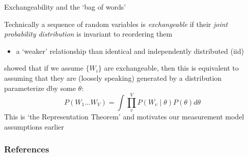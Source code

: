 \documentclass{hertieteaching}\usepackage[]{graphicx}\usepackage[]{color}
\begin{document}
\begin{frame}{Exchangeability and the `bag of words'}
	
Technically a sequence of random variables is \textit{exchangeable} if 
their \textit{joint probability distribution} is invariant to reordering them
\begin{itemize}
  \item a `weaker' relationship than identical and independently distributed (iid)
\end{itemize}

\textcite{deFinetti2008} showed that if we assume $\{W_i\}$ are exchangeable, then this is equivalent to assuming that they are (loosely speaking) generated by a distribution parameterize dby some $\theta$:
$$
P(W_1 \ldots W_V) = \int \prod^V_v P(W_v \mid \theta) P(\theta) d\theta 
$$
This is `the Representation Theorem' and motivates our measurement model assumptions earlier

\begin{center}
\end{center}
\end{frame}


\begin{frame}{}
\end{frame}




\begin{frame}[allowframebreaks]
\frametitle{References}

\printbibliography

\end{frame}
\end{document}
